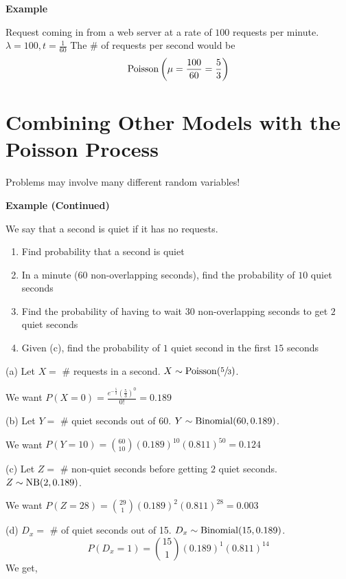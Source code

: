 \textbf{Example}

Request coming in from a web server at a rate of $ 100 $ requests per minute.
$ \lambda = 100, t=\frac{1}{60} $
The \# of requests per second would be
\[ \operatorname{Poisson}\left(\mu=\frac{100}{60}=\frac{5}{3}\right) \]

\section{Combining Other Models with the Poisson Process}

Problems may involve many different random variables!

\textbf{Example (Continued)}

We say that a second is quiet if it has no requests.
\begin{enumerate}[label=(\alph*)]
    \item Find probability that a second is quiet
    \item In a minute ($60$ non-overlapping seconds), find the probability of $10$ quiet seconds
    \item Find the probability of having to wait $ 30 $ non-overlapping seconds to get $ 2 $ quiet seconds
    \item Given (c), find the probability of $ 1 $ quiet second in the first $ 15 $ seconds
\end{enumerate}
(a) Let $ X= $ \# requests in a second. $ X \sim \operatorname{Poisson}(\sfrac{5}{3}) $.

We want $ P(X=0)=\frac{e^{-\frac{5}{3}}\left(\frac{5}{3}\right)^0}{0!}=0.189 $


(b) Let $ Y= $ \# quiet seconds out of 60. $ Y \sim \operatorname{Binomial}(60,0.189) $.

We want $ P(Y=10)=\binom{60}{10}(0.189)^{10}(0.811)^{50}=0.124 $

(c) Let $ Z= $ \# non-quiet seconds before getting $ 2 $ quiet seconds.
$ Z \sim \operatorname{NB}(2,0.189) $.

We want $ P(Z=28)=\binom{29}{1}(0.189)^2(0.811)^{28}=0.003 $

(d) $ D_x=$ \# of quiet seconds out of 15. $ D_x \sim \operatorname{Binomial}(15,0.189) $.
\[ P(D_x=1)=\binom{15}{1}(0.189)^1(0.811)^{14} \]
We get,

